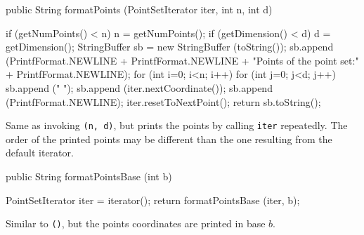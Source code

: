 \begin{htmlonly}
\end{htmlonly}
\begin{code}

   public String formatPoints (PointSetIterator iter, int n, int d) \begin{hide} {
      if (getNumPoints() < n)
         n = getNumPoints();
      if (getDimension() < d)
         d = getDimension();
      StringBuffer sb = new StringBuffer (toString());
      sb.append (PrintfFormat.NEWLINE + PrintfFormat.NEWLINE
                 + "Points of the point set:" + PrintfFormat.NEWLINE);
      for (int i=0; i<n; i++) {
        for (int j=0; j<d; j++) {
            sb.append ("  ");
            sb.append (iter.nextCoordinate());
         }
         sb.append (PrintfFormat.NEWLINE);
         iter.resetToNextPoint();
      }
      return sb.toString();
   }\end{hide}
\end{code}
\begin{tabb}
  Same as invoking \texttt{(n, d)}, but
   prints the points  by calling \texttt{iter} repeatedly. The order of
   the printed points may be different than the one resulting from the
  default iterator.
\end{tabb}
\begin{htmlonly}
\end{htmlonly}
\begin{code}

   public String formatPointsBase (int b) \begin{hide} {
      PointSetIterator iter = iterator();
      return formatPointsBase (iter, b);
   }\end{hide}
\end{code}
\begin{tabb}
Similar to \texttt{()}, but the
points coordinates are printed in base $b$.
\end{tabb}
\begin{htmlonly}
\end{htmlonly}
